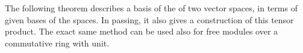 \documentclass[12pt]{article}
\begin{document}
The following theorem describes a basis of the 
of two vector spaces, in terms of given bases of the 
spaces. In passing, it also gives a construction of this tensor 
product. The exact same method can be used also for free 
modules over a commutative ring with unit.


\end{document}

